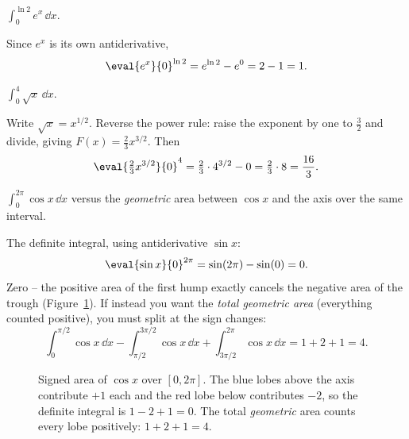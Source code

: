 \begin{example}\label{ch21:ex-exp}
$\displaystyle \int_0^{\ln 2} e^{x}\,\dd x.$

Since $e^x$ is its own antiderivative,
\[
  \eval{e^x}{0}^{\ln 2} = e^{\ln 2} - e^{0} = 2 - 1 = 1.
\]
\end{example}

\begin{example}\label{ch21:ex-sqrt}
$\displaystyle \int_0^{4} \sqrt{x}\,\dd x.$

Write $\sqrt{x}=x^{1/2}$. Reverse the power rule: raise the exponent by one to
$\tfrac32$ and divide, giving $F(x)=\tfrac{2}{3}x^{3/2}$. Then
\[
  \eval{\tfrac23 x^{3/2}}{0}^{4} = \tfrac23\cdot 4^{3/2} - 0
  = \tfrac23\cdot 8 = \frac{16}{3}.
\]
\end{example}

\begin{example}\label{ch21:ex-signed}
$\displaystyle \int_0^{2\pi}\cos x\,\dd x$ versus the \emph{geometric} area
between $\cos x$ and the axis over the same interval.

The definite integral, using antiderivative $\sin x$:
\[
  \eval{\sin x}{0}^{2\pi} = \sin(2\pi)-\sin(0) = 0 .
\]
Zero -- the positive area of the first hump exactly cancels the negative area of
the trough (Figure~\ref{ch21:fig-signed}). If instead you want the \emph{total
geometric area} (everything counted positive), you must split at the sign
changes:
\[
  \int_0^{\pi/2}\!\cos x\,\dd x - \int_{\pi/2}^{3\pi/2}\!\cos x\,\dd x
  + \int_{3\pi/2}^{2\pi}\!\cos x\,\dd x
  = 1 + 2 + 1 = 4 .
\]

\begin{figure}[H]
\centering
{}
\caption{Signed area of $\cos x$ over $[0,2\pi]$. The blue lobes above the axis
contribute $+1$ each and the red lobe below contributes $-2$, so the definite
integral is $1-2+1=0$. The total \emph{geometric} area counts every lobe
positively: $1+2+1=4$.}
\label{ch21:fig-signed}
\end{figure}
\end{example}

